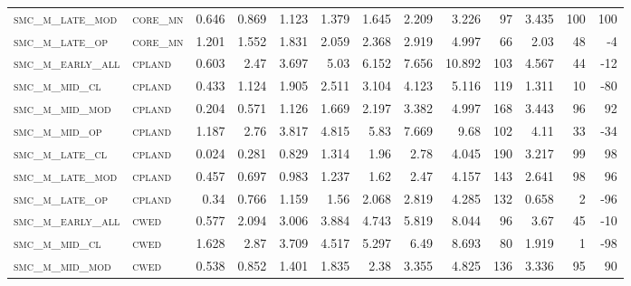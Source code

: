 \begin{landscape}
\begin{center}
\begin{footnotesize}
\begin{longtable}{llrrrrrrrr|rrr}
\textsc{smc\_m\_late\_mod } & \textsc{core\_mn  }   & 0.646    & 0.869    & 1.123    & 1.379    & 1.645    & 2.209    & 3.226    & 97     & 3.435         & 100           & 100             \\
\textsc{smc\_m\_late\_op  } & \textsc{core\_mn  }   & 1.201    & 1.552    & 1.831    & 2.059    & 2.368    & 2.919    & 4.997    & 66     & 2.03          & 48            & -4              \\
\textsc{smc\_m\_early\_all} & \textsc{cpland    }   & 0.603    & 2.47     & 3.697    & 5.03     & 6.152    & 7.656    & 10.892   & 103    & 4.567         & 44            & -12             \\
\textsc{smc\_m\_mid\_cl   } & \textsc{cpland    }   & 0.433    & 1.124    & 1.905    & 2.511    & 3.104    & 4.123    & 5.116    & 119    & 1.311         & 10            & -80             \\
\textsc{smc\_m\_mid\_mod  } & \textsc{cpland    }   & 0.204    & 0.571    & 1.126    & 1.669    & 2.197    & 3.382    & 4.997    & 168    & 3.443         & 96            & 92              \\
\textsc{smc\_m\_mid\_op   } & \textsc{cpland    }   & 1.187    & 2.76     & 3.817    & 4.815    & 5.83     & 7.669    & 9.68     & 102    & 4.11          & 33            & -34             \\
\textsc{smc\_m\_late\_cl  } & \textsc{cpland    }   & 0.024    & 0.281    & 0.829    & 1.314    & 1.96     & 2.78     & 4.045    & 190    & 3.217         & 99            & 98              \\
\textsc{smc\_m\_late\_mod } & \textsc{cpland    }   & 0.457    & 0.697    & 0.983    & 1.237    & 1.62     & 2.47     & 4.157    & 143    & 2.641         & 98            & 96              \\
\textsc{smc\_m\_late\_op  } & \textsc{cpland    }   & 0.34     & 0.766    & 1.159    & 1.56     & 2.068    & 2.819    & 4.285    & 132    & 0.658         & 2             & -96             \\
\textsc{smc\_m\_early\_all} & \textsc{cwed      }   & 0.577    & 2.094    & 3.006    & 3.884    & 4.743    & 5.819    & 8.044    & 96     & 3.67          & 45            & -10             \\
\textsc{smc\_m\_mid\_cl   } & \textsc{cwed      }   & 1.628    & 2.87     & 3.709    & 4.517    & 5.297    & 6.49     & 8.693    & 80     & 1.919         & 1             & -98             \\
\textsc{smc\_m\_mid\_mod  } & \textsc{cwed      }   & 0.538    & 0.852    & 1.401    & 1.835    & 2.38     & 3.355    & 4.825    & 136    & 3.336         & 95            & 90              \\

\end{longtable}
\end{footnotesize}
\end{center}
\end{landscape}
